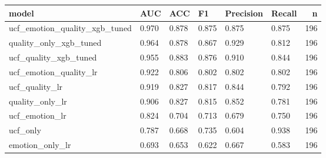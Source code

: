 \begin{tabular}{llllllr}
\toprule
model & AUC & ACC & F1 & Precision & Recall & n \\
\midrule
ucf\_emotion\_quality\_xgb\_tuned & 0.970 & 0.878 & 0.875 & 0.875 & 0.875 & 196 \\
quality\_only\_xgb\_tuned & 0.964 & 0.878 & 0.867 & 0.929 & 0.812 & 196 \\
ucf\_quality\_xgb\_tuned & 0.955 & 0.883 & 0.876 & 0.910 & 0.844 & 196 \\
ucf\_emotion\_quality\_lr & 0.922 & 0.806 & 0.802 & 0.802 & 0.802 & 196 \\
ucf\_quality\_lr & 0.919 & 0.827 & 0.817 & 0.844 & 0.792 & 196 \\
quality\_only\_lr & 0.906 & 0.827 & 0.815 & 0.852 & 0.781 & 196 \\
ucf\_emotion\_lr & 0.824 & 0.704 & 0.713 & 0.679 & 0.750 & 196 \\
ucf\_only & 0.787 & 0.668 & 0.735 & 0.604 & 0.938 & 196 \\
emotion\_only\_lr & 0.693 & 0.653 & 0.622 & 0.667 & 0.583 & 196 \\
\bottomrule
\end{tabular}
